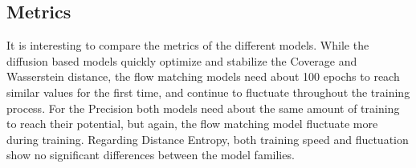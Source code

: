 \documentclass{article}
\begin{document}
\subsection{Metrics}

It is interesting to compare the metrics of the different models. While the diffusion based models quickly optimize and stabilize the Coverage and Wasserstein distance, the flow matching models need about 100 epochs to reach similar values for the first time, and continue to fluctuate throughout the training process. For the Precision both models need about the same amount of training to reach their potential, but again, the flow matching model fluctuate more during training. Regarding Distance Entropy, both training speed and fluctuation show no significant differences between the model families.



\end{document}
